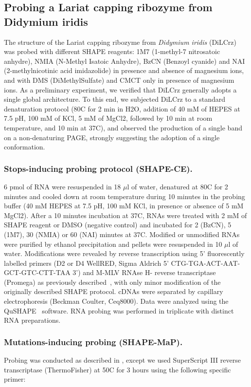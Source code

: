 \documentclass[a4,center,fleqn]{NAR}
\begin{document}
\subsection{Probing a Lariat capping ribozyme from Didymium iridis}
The structure of the Lariat capping ribozyme from \textit{Didymium iridis }(DiLCrz) was probed with different SHAPE reagents: 1M7 (1-methyl-7 nitrosatoic anhydre), NMIA (N-Methyl Isatoic Anhydre), BzCN (Benzoyl cyanide) and NAI (2-methylnicotinic acid imidazolide) in presence and absence of magnesium ions, and with DMS (DiMethylSulfate) and CMCT only in presence of magnesium ions.
As a preliminary experiment, we verified that DiLCrz generally adopts a single global architecture. To this end, we subjected DiLCrz to a standard denaturation protocol (80\degree{}C for 2 min in H2O, addition of 40 mM of HEPES at 7.5 pH, 100 mM of KCl, 5 mM of MgCl2, followed by 10 min at room temperature, and 10 min at 37\degree{}C), and observed the production of a single band on a non-denaturing PAGE, strongly suggesting the adoption of a single conformation.

\subsubsection{Stops-inducing probing protocol (SHAPE-CE).} 
6 pmol of RNA were resuspended in 18 $\mu$l of water, denatured at 80\degree{}C for 2 minutes and cooled down at room temperature during 10 minutes in the probing buffer (40 mM HEPES at 7.5 pH, 100 mM KCl, in presence or absence of 5 mM MgCl2). After a 10 minutes incubation at 37\degree{}C, RNAs were treated with 2 mM of SHAPE reagent or DMSO (negative control) and incubated for 2 (BzCN), 5 (1M7), 30 (NMIA) or 60 (NAI) minutes at 37\degree{}C. Modified or unmodified RNAs were purified by ethanol precipitation and pellets were resuspended in 10 $\mu$l of water.
Modifications were revealed by reverse transcription using 5’ fluorescently labelled primers (D2 or D4 WellRED, Sigma Aldrich 5’ CTG-TGA-ACT-AAT-GCT-GTC-CTT-TAA 3’) and M-MLV RNAse H- reverse transcriptase (Promega) as previously described~\cite{Deforges2017}, with only minor modification of the originally described SHAPE protocol\cite{Wilkinson2006}. cDNAs were separated by capillary electrophoresis (Beckman Coulter, Ceq8000). Data were analyzed using the  QuSHAPE~\cite{Karabiber2013} software. RNA probing was performed in triplicate with distinct RNA preparations.

\subsubsection{Mutations-inducing probing (SHAPE-MaP).}
Probing was conducted as described in \citet{Smola2015}, except we used SuperScript III reverse transcriptase (ThermoFisher) at 50\degree{}C for 3 hours using the following specific primer: 
\end{document}
